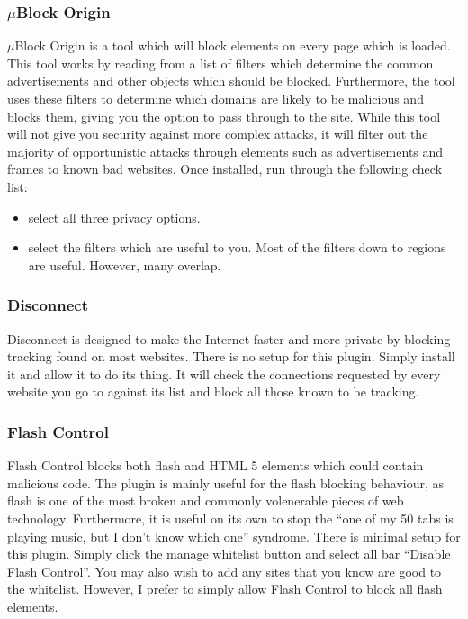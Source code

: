 \documentclass[a4paper,11pt]{report}
\begin{document}
		\subsubsection{$\mu{}$Block Origin}
			$\mu$Block Origin is a tool which will block elements on every page which is loaded. 
			This tool works by reading from a list of filters which determine the common advertisements and other objects which should be blocked. 
			Furthermore, the tool uses these filters to determine which domains are likely to be malicious and blocks them, giving you the option to pass through to the site. 
			While this tool will not give you security against more complex attacks, it will filter out the majority of opportunistic attacks through elements such as advertisements and frames to known bad websites. 
			Once installed, run through the following check list: 
			\begin{itemize}
				\item select all three privacy options.
				\item select the filters which are useful to you. 
					Most of the filters down to regions are useful. However, many overlap. 
			\end{itemize}
		\subsubsection{Disconnect}
			Disconnect is designed to make the Internet faster and more private by blocking tracking found on most websites. 
			There is no setup for this plugin. Simply install it and allow it to do its thing. 
			It will check the connections requested by every website you go to against its list and block all those known to be tracking. 
		\subsubsection{Flash Control}
			Flash Control blocks both flash and HTML 5 elements which could contain malicious code. 
			The plugin is mainly useful for the flash blocking behaviour, as flash is one of the most broken and commonly volenerable pieces of web technology. 
			Furthermore, it is useful on its own to stop the ``one of my 50 tabs is playing music, but I don't know which one'' syndrome. 
			There is minimal setup for this plugin. Simply click the manage whitelist button and select all bar ``Disable Flash Control''. 
			You may also wish to add any sites that you know are good to the whitelist. 
			However, I prefer to simply allow Flash Control to block all flash elements. 
\end{document}
